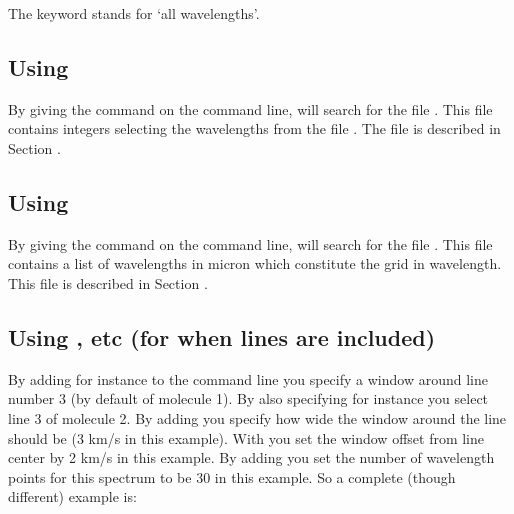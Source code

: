 \documentclass[letterpaper,10pt,english]{sphinxmanual}
\begin{document}
The keyword  stands for ‘all wavelengths’.


\subsection{Using }
\label{\detokenize{imagesspectra:using-loadcolor}}
By giving the command  on the command line,  will search
for the file . This file contains integers selecting the
wavelengths from the file . The file is described in
Section {\hyperref[\detokenize{inputoutputfiles:sec-color-inus}]{}}.


\subsection{Using }
\label{\detokenize{imagesspectra:using-loadlambda}}
By giving the command  on the command line,  will
search for the file . This file contains a list
of wavelengths in micron which constitute the grid in wavelength. This file is
described in Section {\hyperref[\detokenize{inputoutputfiles:sec-camera-wavelengths}]{}}.


\subsection{Using ,  etc (for when lines are included)}
\label{\detokenize{imagesspectra:using-iline-imolspec-etc-for-when-lines-are-included}}
By adding for instance  to the command line you specify a window
around line number 3 (by default of molecule 1). By also specifying for instance
 you select line 3 of molecule 2. By adding  you
specify how wide the window around the line should be (3 km/s in this
example). With  you set the window offset from line center by 2 km/s
in this example. By adding  you set the number of wavelength
points for this spectrum to be 30 in this example. So a complete (though
different) example is:
\end{document}
